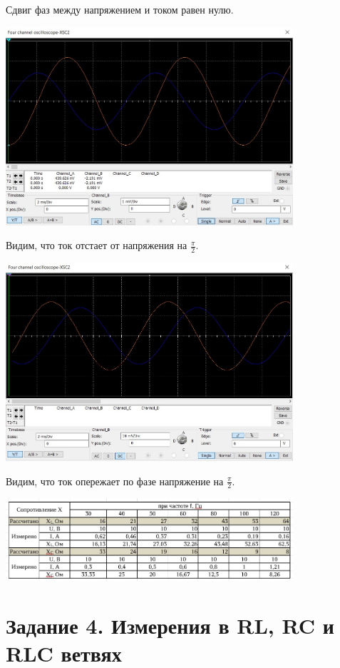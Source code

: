 \documentclass[14pt, a4paper]{article}
\begin{document}
        Сдвиг фаз между напряжением и током равен нулю.

        {
            \includegraphics[width=0.8\textwidth]{O2.jpg}
            \centering
        }

        Видим, что ток отстает от напряжения на $\frac{\pi}2$.


        {
            \includegraphics[width=0.8\textwidth]{O3.jpg}
            \centering
        }

        Видим, что ток опережает по фазе напряжение на $\frac{\pi}2$.

        {
            \includegraphics[width=0.8\textwidth]{Table.jpg}
            \centering
        }

    \section*{Задание 4. Измерения в RL, RC и RLC ветвях}
\end{document}
